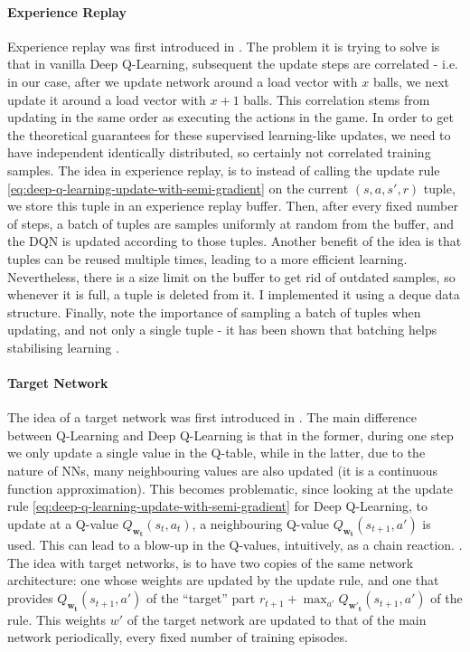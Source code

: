 \paragraph{Experience Replay}


Experience replay was first introduced in \cite{lin1992experiencereplay}. The problem it is trying to solve is that in vanilla Deep Q-Learning, subsequent the update steps are correlated - i.e. in our case, after we update network around a load vector with $x$ balls, we next update it around a load vector with $x+1$ balls. This correlation stems from updating in the same order as executing the actions in the game. In order to get the theoretical guarantees for these supervised learning-like updates, we need to have independent identically distributed, so certainly not correlated training samples. The idea in experience replay, is to instead of calling the update rule \ref{eq:deep-q-learning-update-with-semi-gradient} on the current $(s, a, s', r)$ tuple, we store this tuple in an experience replay buffer. Then, after every fixed number of steps, a batch of tuples are samples uniformly at random from the buffer, and the DQN is updated according to those tuples. Another benefit of the idea is that tuples can be reused multiple times, leading to a more efficient learning. Nevertheless, there is a size limit on the buffer to get rid of outdated samples, so whenever it is full, a tuple is deleted from it. I implemented it using a deque data structure. Finally, note the importance of sampling a batch of tuples when updating, and not only a single tuple - it has been shown that batching helps stabilising learning \cite{qian2020batchingsgd}.


\paragraph{Target Network}


The idea of a target network was first introduced in \cite{argueta1992targetnetwork}. The main difference between Q-Learning and Deep Q-Learning is that in the former, during one step we only update a single value in the Q-table, while in the latter, due to the nature of NNs, many neighbouring values are also updated (it is a continuous function approximation). This becomes problematic, since looking at the update rule \ref{eq:deep-q-learning-update-with-semi-gradient} for Deep Q-Learning, to update at a Q-value $Q_{\mathbf{w_t}}(s_t, a_t)$, a neighbouring Q-value $Q_{\mathbf{w_t}}(s_{t+1}, a')$ is used. This can lead to a blow-up in the Q-values, intuitively, as a chain reaction. . The idea with target networks, is to have two copies of the same network architecture: one whose weights are updated by the update rule, and one that provides $Q_{\mathbf{w_t}}(s_{t+1}, a')$ of the ``target'' part $r_{t+1}+ \max_{a'} Q_{\mathbf{w'_t}}(s_{t+1}, a')$ of the rule. This weights $w'$ of the target network are updated to that of the main network periodically, every fixed number of training episodes.



